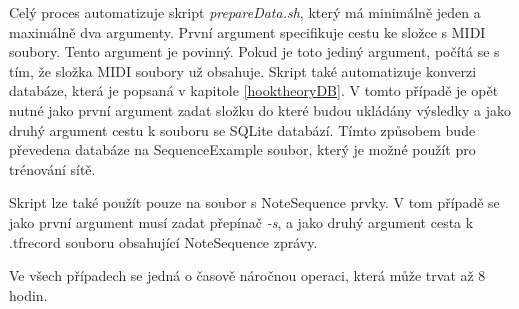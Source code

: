 Celý proces automatizuje skript \emph{prepareData.sh},
který má minimálně jeden a maximálně dva argumenty.
První argument specifikuje cestu ke složce s MIDI soubory.
Tento argument je povinný.
Pokud je toto jediný argument, počítá se s tím,
že složka MIDI soubory už obsahuje.
Skript také automatizuje konverzi databáze, která je popsaná v kapitole \ref{hooktheoryDB}.
V tomto případě je opět nutné jako první argument zadat 
složku do které budou ukládány výsledky
a jako druhý argument cestu k souboru se SQLite databází.
Tímto způsobem bude převedena databáze na SequenceExample soubor,
který je možné použít pro trénování sítě.
\par

Skript lze také použít pouze na soubor s NoteSequence prvky.
V tom případě se jako první argument musí zadat přepínač \emph{-s},
a jako druhý argument cesta k .tfrecord souboru obsahující NoteSequence zprávy.
\par

Ve všech případech se jedná o časově náročnou operaci, která může trvat až 8 hodin.

